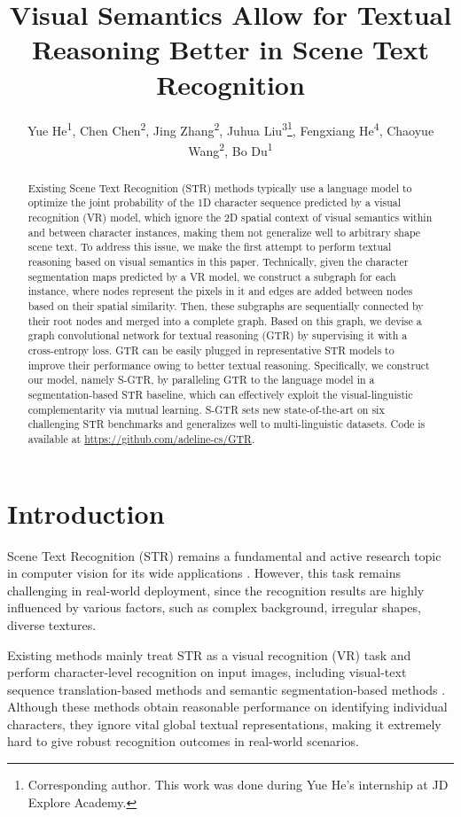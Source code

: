 \documentclass[letterpaper]{article} \usepackage{aaai22}  \usepackage{times}  \usepackage{helvet}  \usepackage{courier}  \usepackage[hyphens]{url}  \usepackage{graphicx} \urlstyle{rm} \def\UrlFont{\rm}  \usepackage{natbib}  \usepackage{caption} \DeclareCaptionStyle{ruled}{labelfont=normalfont,labelsep=colon,strut=off} \frenchspacing  \setlength{\pdfpagewidth}{8.5in}  \setlength{\pdfpageheight}{11in}
\title{
Visual Semantics Allow for Textual Reasoning Better in Scene Text Recognition
}
\author{
Yue He\textsuperscript{\rm 1},
    Chen Chen\textsuperscript{\rm 2},
    Jing Zhang\textsuperscript{\rm 2},
    Juhua Liu\textsuperscript{\rm 3}\footnote{Corresponding author. This work was done during Yue He's internship at JD Explore Academy.},
    Fengxiang He\textsuperscript{\rm 4},
    Chaoyue Wang\textsuperscript{\rm 2},
    Bo Du\textsuperscript{\rm 1}\footnotemark[1]
}
\newcommand{\bt}{\color{black}}
\begin{document}
\maketitle

\begin{abstract}

Existing Scene Text Recognition (STR) methods typically use a language model to optimize the joint probability of the 1D character sequence predicted by a visual recognition (VR) model, which ignore the 2D spatial context of visual semantics within and between character instances, making them not generalize well to arbitrary shape scene text. To address this issue, we make the first attempt to perform textual reasoning based on visual semantics in this paper. Technically, given the character segmentation maps predicted by a VR model, we construct a subgraph for each instance, where nodes represent the pixels in it and edges are added between nodes based on their spatial similarity. Then, these subgraphs are sequentially connected by their root nodes and merged into a complete graph. Based on this graph, we devise a graph convolutional network for textual reasoning (GTR) by supervising it with a cross-entropy loss. GTR can be easily plugged in representative STR models to improve their performance owing to better textual reasoning. Specifically, we construct our model, namely S-GTR, by paralleling GTR to the language model in a segmentation-based STR baseline,
which can effectively exploit the visual-linguistic complementarity via mutual learning. S-GTR sets new state-of-the-art on six challenging STR benchmarks and generalizes well to multi-linguistic datasets. Code is available at \url{https://github.com/adeline-cs/GTR}.

\end{abstract}


\section{Introduction}

Scene Text Recognition (STR) remains a fundamental and active research topic in computer vision for its wide applications \cite{zhang2020empowering}. However, this task remains challenging in real-world deployment, since the recognition results are highly influenced by various factors, such as complex background, irregular shapes, diverse textures.


Existing methods mainly treat STR as a visual recognition (VR) task and perform character-level recognition on input images, including visual-text sequence translation-based methods{ \bt \cite{yang2017learning,shi2018aster,baek2019wrong,li2019show,litman2020scatter}} and semantic segmentation-based methods \cite{liao2019scene,wan2020textscanner}. Although these methods obtain reasonable performance on identifying individual characters, they ignore vital global textual representations, making it extremely hard to give robust recognition outcomes in real-world scenarios. 
\end{document}
